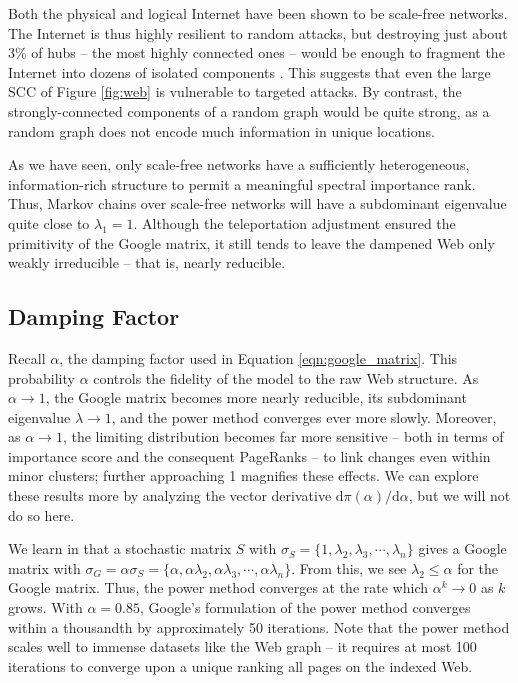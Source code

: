 \documentclass[12pt]{article}
\newcommand{\dee}{\mathrm{d}}
\begin{document}
Both the physical and logical Internet have been shown to be scale-free
networks. The Internet is thus highly resilient to random attacks, but
destroying just about 3\% of hubs -- the most highly connected ones -- would be
enough to fragment the Internet into dozens of isolated components
\cite{barabasiNetworkScienceScaleFree}. This suggests that even the large SCC of
Figure \ref{fig:web} is vulnerable to targeted attacks. By contrast, the
strongly-connected components of a random graph would be quite strong, as a
random graph does not encode much information in unique locations.

As we have seen, only scale-free networks have a sufficiently heterogeneous,
information-rich structure to permit a meaningful spectral importance rank.
Thus, Markov chains over scale-free networks will have a subdominant eigenvalue
quite close to $\lambda_1 = 1$. Although the teleportation adjustment ensured
the primitivity of the Google matrix, it still tends to leave the dampened Web
only weakly irreducible -- that is, nearly reducible.


\subsection{Damping Factor}
Recall $\alpha$, the damping factor used in Equation \eqref{eqn:google_matrix}.
This probability $\alpha$ controls the fidelity of the model to the raw Web
structure. As $\alpha \to 1$, the Google matrix becomes more nearly reducible,
its subdominant eigenvalue $\lambda \to 1$, and the power method converges ever
more slowly. Moreover, as $\alpha \to 1$, the limiting distribution becomes far
more sensitive -- both in terms of importance score and the consequent PageRanks
-- to link changes even within minor clusters; further approaching 1 magnifies
these effects. We can explore these results more by analyzing the vector
derivative $\dee\pi(\alpha)/\dee\alpha$, but we will not do so here.

We learn in \cite{haveliwalaSecondEigenvalueGoogle} that a stochastic matrix $S$
with $\sigma_S = \{ 1, \lambda_2, \lambda_3, \cdots, \lambda_n \}$ gives a
Google matrix with
$\sigma_G = \alpha\sigma_S = \{ \alpha, \alpha\lambda_2, \alpha\lambda_3,
\cdots, \alpha\lambda_n \}$. From this, we see $\lambda_2 \leq \alpha$ for the
Google matrix. Thus, the power method converges at the rate which
$\alpha^k \to 0$ as $k$ grows. With $\alpha = 0.85$, Google's formulation of the
power method converges within a thousandth by approximately 50 iterations. Note
that the power method scales well to immense datasets like the Web graph -- it
requires at most 100 iterations to converge upon a unique ranking all pages on
the indexed Web.
\end{document}
